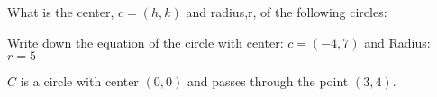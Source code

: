 \documentclass[12pt, a4paper, addpoints]{exam}
\newcommand{\verticalspace}{\vspace{22mm}} %
\begin{document}
\begin{questions}
\large
\question What is the  center, \( c =(h,k) \) and radius,r, of the following circles:
\begin{multicols}{2} %
\end{multicols}




\question Write down the equation of the circle with center: \(c=(-4, 7)\) and Radius: \(r=5\) 
\verticalspace

\question
\( C \) is a circle with center \( (0, 0) \) and passes through the point \( (3, 4) \).

\begin{multicols}{2} %
\end{multicols}













\end{questions}
\end{document}
